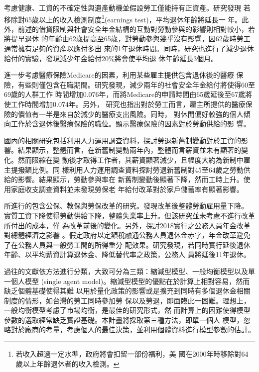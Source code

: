 \documentclass[12pt]{article}
\begin{document}
\begin{CJK*}{UTF8}{bkai}
\cite{french2005}考慮健康、工資的不確定性與遺產動機並假設勞工僅能持有正資產。研究發現
若移除對65歲以上的收入檢測制度\footnote{若收入超過一定水準，政府將會扣留一部份福利，美
國在2000年時移除對64歲以上年齡退休者的收入檢測。}(earnings test)，平均退休年齡將延長一
年。此外，前述的借貸限制與社會安全年金結構的互動對勞動參與的影響則相對較小，若將提早退休
的年齡由62歲提高至65歲，對勞動參與幾乎沒有影響，因62歲時勞工通常擁有足夠的資產以應付多出
來的1年退休時間。同時，研究也進行了減少退休給付的實驗，發現減少年金給付20\%將會使平均退
休年齡延長3個月。

\cite{french2011}進一步考慮醫療保險Medicare的因素，利用某些雇主提供包含退休後的醫療
保險，有些則僅包含在職期間。研究發現，減少兩年的社會安全年金給付將使得60至69歲的人群工作
時間增加0.076年，而將Medicare的申請時間由65歲延後至67歲將使工作時間增加0.074年。另外，
研究也指出對於勞工而言，雇主所提供的醫療保險的價值有一半是來自於減少的醫療支出風險。同時，
對休閒偏好較強的個人傾向工作於含退休後醫療保險的職位。顯示醫療保險的因素對於勞動供給的影
響。

國內的相關研究包括\cite{yang2009}利用人力運用調查資料，探討勞退新舊制變動對於工資的影
響。結果顯示，整體而言，在新舊制變動兩年內，整體而言薪資並未有顯著的變化。然而限縮在變
動後才取得工作者，其薪資顯著減少，且幅度大約為新制中雇主提撥額比例。\cite{yang2010}同
樣利用人力運用調查資料探討勞退新舊制對45至64歲之勞動供給的影響。結果顯示，勞動參與率在
新舊制變動後顯著下降，然而工時上升。\cite{chen2015}使用家庭收支調查資料並未發現勞保老
年給付改革對於家戶儲蓄率有顯著影響。

\cite{reform2017}所進行的包含公保、教保與勞保改革的研究。發現改革後整體勞動雇用量下降。
實質工資下降使得勞動供給下降，整體失業率上升。但該研究並未考慮不進行改革所付出的成本，僅
為改革前後的變化。另外，\cite{jhang2020}探討2018實行之公務人員年金改革對總體經濟之影響
。假定政府以定額稅融通公務人員退休金赤字，年金改革避免了在公務人員與一般勞工間的所得重分
配效果。研究發現，若同時實行延後退休年齡、以平均薪資計算退休金、降低替代率之政策，公務人
員將延後11年退休。

過往的文獻依方法進行分類，大致可分為三類：縮減型模型、一般均衡模型以及單一個人模型
(single agent model)。縮減型模型的優點在於計算上相對容易，然而缺乏個體基礎使得其難
以用於量化政策的影響或是擴充到同時有多個退休金相關制度的情形，如台灣的勞工同時參加勞
保以及勞退，即面臨此一困難。理想上，一般均衡模型考慮了市場均衡，是最佳的研究形式，然
而計算上的困難使得模型參數的選取經常缺乏實證基礎。本計畫將採取第三種方法，即單一個人
模型，忽略對於廠商的考量，考慮個人的最佳決策，並利用個體資料進行模型參數的估計。


\end{CJK*}
\end{document}
